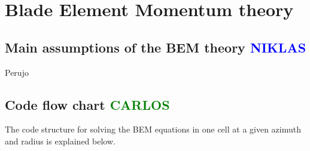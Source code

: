 \chapter{Blade Element Momentum theory}

\section{Main assumptions of the BEM theory \textcolor{blue}{NIKLAS}}

Perujo

\section{Code flow chart \textcolor{green}{CARLOS}}

The code structure for solving the BEM equations in one cell at a given azimuth and radius is explained below.

